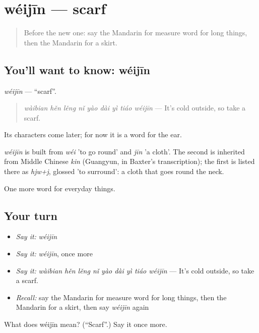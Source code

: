 \section[wéijīn]{wéijīn — scarf}

\label{lesson:ZH-C165-weijin}



\begin{quote}
Before the new one: say the Mandarin for measure word for long things, then the Mandarin for a skirt.
\end{quote}

\subsection*{You'll want to know: wéijīn}
\emph{wéijīn} — \textquotedblleft{}scarf\textquotedblright{}.

\begin{quote}
\emph{wàibian hěn lěng nǐ yào dài yì tiáo wéijīn} — It's cold outside, so take a scarf.
\end{quote}

Its characters come later; for now it is a word for the ear.

\begin{cousinweb}
\emph{wéijīn} is built from \emph{wéi} 'to go round' and \emph{jīn} 'a cloth'. The second is inherited from Middle Chinese \emph{kin} (Guangyun, in Baxter's transcription); the first is listed there as \emph{hjw+j}, glossed 'to surround': a cloth that goes round the neck.
\end{cousinweb}

\begin{grammarlens}[title={What you've built}]
One more word for everyday things.
\end{grammarlens}

\subsection*{Your turn}
\begin{itemize}
\raggedright
  \item \emph{Say it:} \emph{wéijīn}
  \item \emph{Say it:} \emph{wéijīn}, once more
  \item \emph{Say it:} \emph{wàibian hěn lěng nǐ yào dài yì tiáo wéijīn} — It's cold outside, so take a scarf.
  \item \emph{Recall:} say the Mandarin for measure word for long things, then the Mandarin for a skirt, then say \emph{wéijīn} again
\end{itemize}

\begin{tcolorbox}[breakable,colback=teal!4,colframe=teal!35!black,title={Before you move on}]
What does wéijīn mean? (\textquotedblleft{}Scarf\textquotedblright{}.) Say it once more.
\end{tcolorbox}
